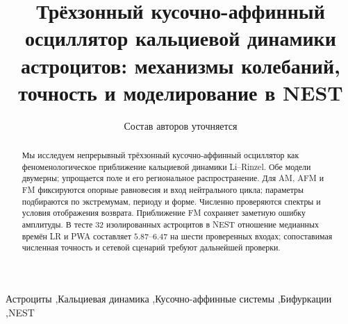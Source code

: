 \documentclass[final,5p,times,twocolumn]{elsarticle}
\begin{document}
\raggedbottom
\begin{frontmatter}
\title{Трёхзонный кусочно-аффинный осциллятор кальциевой динамики астроцитов: механизмы колебаний, точность и моделирование в NEST}
\author{Состав авторов уточняется}
\begin{abstract}
Мы исследуем непрерывный трёхзонный кусочно-аффинный осциллятор как феноменологическое приближение кальциевой динамики Li--Rinzel. Обе модели двумерны; упрощается поле и его региональное распространение. Для AM, AFM и FM фиксируются опорные равновесия и вход нейтрального цикла; параметры подбираются по экстремумам, периоду и форме. Численно проверяются спектры и условия отображения возврата. Приближение FM сохраняет заметную ошибку амплитуды. В тесте 32 изолированных астроцитов в NEST отношение медианных времён LR и PWA составляет $5.87$--$6.47$ на шести проверенных входах; сопоставимая численная точность и сетевой сценарий требуют дальнейшей проверки.
\end{abstract}
\begin{keyword}
Астроциты \sep Кальциевая динамика \sep Кусочно-аффинные системы \sep Бифуркации \sep NEST
\end{keyword}
\end{frontmatter}



\end{document}

